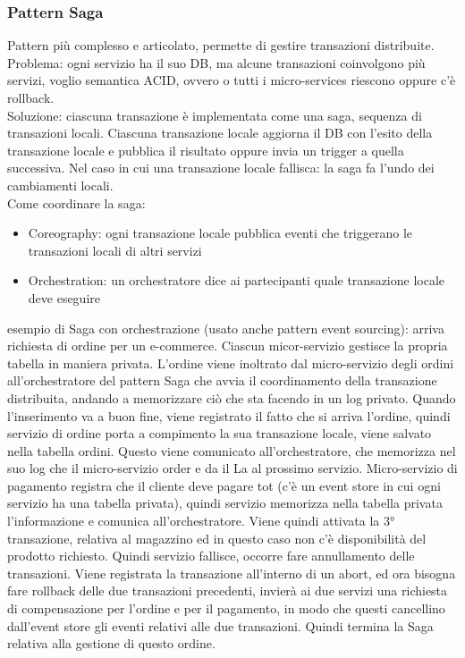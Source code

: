 \documentclass[16px]{article}
\begin{document}
\subsubsection{Pattern Saga}
Pattern più complesso e articolato, permette di gestire transazioni distribuite. Problema: ogni servizio ha il suo DB, ma alcune transazioni coinvolgono più servizi, voglio semantica ACID, ovvero o tutti i micro-services riescono oppure c'è rollback.\\ Soluzione: ciascuna transazione è implementata come una saga, sequenza di transazioni locali. Ciascuna transazione locale aggiorna il DB con l'esito della transazione locale e pubblica il risultato oppure invia un trigger a quella successiva. Nel caso in cui una transazione locale fallisca: la saga fa l'undo dei cambiamenti locali.\\ Come coordinare la saga:
\begin{itemize}
\item Coreography: ogni transazione locale pubblica eventi che triggerano le transazioni locali di altri servizi
\item Orchestration: un orchestratore dice ai partecipanti quale transazione locale deve eseguire
\end{itemize}
esempio di Saga con orchestrazione (usato anche pattern event sourcing): arriva richiesta di ordine per un e-commerce. Ciascun micor-servizio gestisce la propria tabella in maniera privata. L'ordine viene inoltrato dal micro-servizio degli ordini all'orchestratore del pattern Saga che avvia il coordinamento della transazione distribuita, andando a memorizzare ciò che sta facendo in un log privato. Quando l'inserimento va a buon fine, viene registrato il fatto che si arriva l'ordine, quindi servizio di ordine porta a compimento la sua transazione locale, viene salvato nella tabella ordini. Questo viene comunicato all'orchestratore, che memorizza nel suo log che il micro-servizio order e da il La al prossimo servizio. Micro-servizio di pagamento registra che il cliente deve pagare tot (c'è un event store in cui ogni servizio ha una tabella privata), quindi servizio memorizza nella tabella privata l'informazione e comunica all'orchestratore. Viene quindi attivata la 3° transazione, relativa al magazzino ed in questo caso non c'è disponibilità del prodotto richiesto. Quindi servizio fallisce, occorre fare annullamento delle transazioni. Viene registrata la transazione all'interno di un abort, ed ora bisogna fare rollback delle due transazioni precedenti, invierà ai due servizi una richiesta di compensazione per l'ordine e per il pagamento, in modo che questi cancellino dall'event store gli eventi relativi alle due transazioni. Quindi termina la Saga relativa alla gestione di questo ordine.
\end{document}
